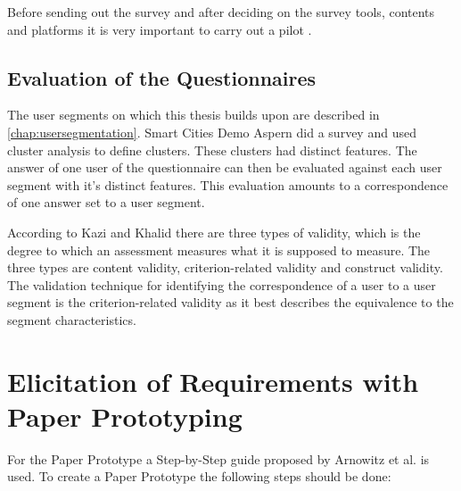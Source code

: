 Before sending out the survey and after deciding on the survey tools, contents and platforms it is very important to carry out a pilot \cite{lumsden2007online}.

\subsection{Evaluation of the Questionnaires}

The user segments on which this thesis builds upon are described in \ref{chap:usersegmentation}. Smart Cities Demo Aspern did a survey and used cluster analysis to define clusters. These clusters had distinct features. The answer of one user of the questionnaire can then be evaluated against each user segment with it's distinct features. This evaluation amounts to a correspondence of one answer set to a user segment.

According to Kazi and Khalid \cite{kazi2012questionnaire} there are three types of validity, which is the degree to which an assessment measures what it is supposed to measure. The three types are content validity, criterion-related validity and construct validity. The validation technique for identifying the correspondence of a user to a user segment is the criterion-related validity as it best describes the equivalence to the segment characteristics.

\section{Elicitation of Requirements with Paper Prototyping}
  For the Paper Prototype a Step-by-Step guide proposed by Arnowitz et al. \cite{arnowitz2010effective} is used. To create a Paper Prototype the following steps should be done:

